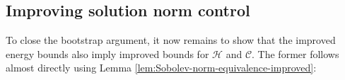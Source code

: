 \documentclass[11pt,leqno,textwidth=10cm]{amsart}
\numberwithin{equation}{section}
\theoremstyle{definition}
\theoremstyle{plain}
\newcommand{\1}{\mathbbm{1}}
\newcommand{\E}{\mathcal{E}}
\newcommand{\Ric}{\text{\normalfont{Ric}}}
\renewcommand{\epsilon}{\varepsilon}
\begin{document}
%

\subsection{Improving solution norm control}\label{subsec:bs-imp-norm}

To close the bootstrap argument, it now remains to show that the improved energy bounds also imply improved bounds for $\mathcal{H}$ and $\mathcal{C}$. The former follows almost directly using Lemma \ref{lem:Sobolev-norm-equivalence-improved}:
\end{document}
